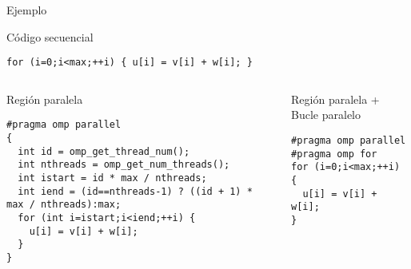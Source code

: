 \begin{frame}[t,fragile]{Ejemplo}
\begin{block}{Código secuencial}
\begin{lstlisting}
for (i=0;i<max;++i) { u[i] = v[i] + w[i]; }
\end{lstlisting}
\end{block}

\pause
\begin{columns}[T]


\begin{block}{Región paralela}
\begin{lstlisting}[basicstyle=\tiny]
#pragma omp parallel
{
  int id = omp_get_thread_num();  
  int nthreads = omp_get_num_threads();
  int istart = id * max / nthreads;
  int iend = (id==nthreads-1) ? ((id + 1) * max / nthreads):max;
  for (int i=istart;i<iend;++i) {
    u[i] = v[i] + w[i]; 
  }
}
\end{lstlisting}
\end{block}


\begin{block}{Región paralela + Bucle paralelo}
\begin{lstlisting}
#pragma omp parallel
#pragma omp for
for (i=0;i<max;++i) { 
  u[i] = v[i] + w[i]; 
}
\end{lstlisting}
\end{block}

\end{columns}
\end{frame}

